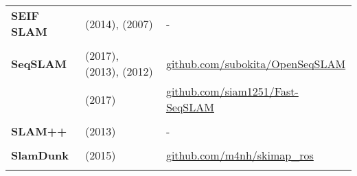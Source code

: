 \documentclass[a4paper,12pt]{scrartcl}
\begin{document}
{\begin{longtable}{l|l|l}
    \textbf{SEIF SLAM}     & \cite{Torres-Gonzalez2014} (2014), \cite{Walter2007} (2007)                                 & -                                                                                                                            \\
                           &                                                                                             &                                                                                                                              \\ [-3mm]
    \textbf{SeqSLAM}       & \cite{bai2017} (2017), \cite{Sunderhauf2013} (2013), \cite{Milford2012} (2012)              & {\href{https://github.com/subokita/OpenSeqSLAM}{github.com/subokita/OpenSeqSLAM}}                                            \\
                           & \cite{Siam2017} (2017)                                                                      & {\href{https://github.com/siam1251/Fast-SeqSLAM}{github.com/siam1251/Fast-SeqSLAM}}                                          \\
                           &                                                                                             &                                                                                                                              \\ [-3mm]
    \textbf{SLAM++}        & \cite{Salas-moreno2013} (2013)                                                              & -                                                                                                                            \\
                           &                                                                                             &                                                                                                                              \\ [-3mm]
    \textbf{SlamDunk}      & \cite{Fioraio2015} (2015)                                                                   & {\href{https://github.com/m4nh/skimap_ros}{github.com/m4nh/skimap\_ros}}                                                     \\
                           &                                                                                             &                                                                                                                              \\ [-3mm]

\end{longtable}}
\end{document}
